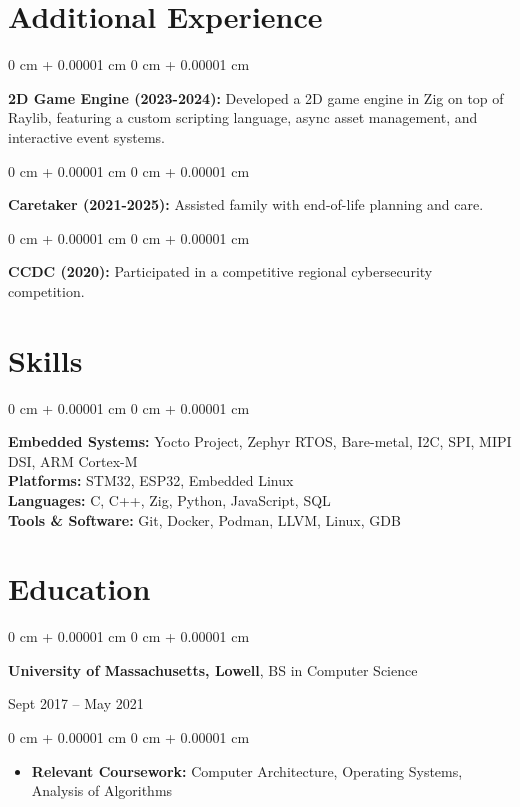 \documentclass[10pt, letterpaper]{article}
\newenvironment{highlights}{
    \begin{itemize}[
        topsep=0.10 cm,
        parsep=0.10 cm,
        partopsep=0pt,
        itemsep=0pt,
        leftmargin=0 cm + 10pt
    ]
}{
    \end{itemize}
} %
\newenvironment{onecolentry}{
    \begin{adjustwidth}{
        0 cm + 0.00001 cm
    }{
        0 cm + 0.00001 cm
    }
}{
    \end{adjustwidth}
} %
\newenvironment{twocolentry}[2][]{
    \onecolentry
    \def\secondColumn{#2}
    \setcolumnwidth{\fill, 6.0 cm}
    \begin{paracol}{2}
}{
    \switchcolumn \raggedleft \secondColumn
    \end{paracol}
    \endonecolentry
} %
\begin{document}
    \section{Additional Experience}
        \begin{onecolentry}
            \textbf{2D Game Engine (2023-2024):} Developed a 2D game engine in Zig on top of Raylib, featuring a custom scripting language, async asset management, and interactive event systems.
        \end{onecolentry}

        \vspace{0.2 cm}

        \begin{onecolentry}
            \textbf{Caretaker (2021-2025):} Assisted family with end-of-life planning and care.
        \end{onecolentry}
        
        \vspace{0.2 cm}

        \begin{onecolentry}
            \textbf{CCDC (2020):} Participated in a competitive regional cybersecurity competition.
        \end{onecolentry}

    \section{Skills}
        \begin{onecolentry}
            \textbf{Embedded Systems:} Yocto Project, Zephyr RTOS, Bare-metal, I2C, SPI, MIPI DSI, ARM Cortex-M \\
            \textbf{Platforms:} STM32, ESP32, Embedded Linux \\
            \textbf{Languages:} C, C++, Zig, Python, JavaScript, SQL \\
            \textbf{Tools \& Software:} Git, Docker, Podman, LLVM, Linux, GDB
        \end{onecolentry}

    \section{Education}
        \begin{twocolentry}{
            Sept 2017 – May 2021
        }
            \textbf{University of Massachusetts, Lowell}, BS in Computer Science
        \end{twocolentry}

        \vspace{0.10 cm}
        \begin{onecolentry}
            \begin{highlights}
                \item \textbf{Relevant Coursework:} Computer Architecture, Operating Systems, Analysis of Algorithms
            \end{highlights}
        \end{onecolentry}
\end{document}
